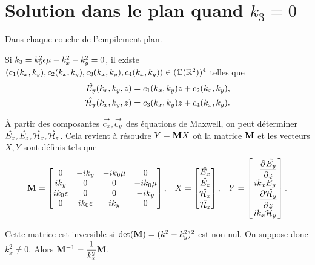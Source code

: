 \section[Solution dans le plan quand k3 = 0]{Solution dans le plan quand \(k_3 = 0\)}
  \label{sec:annexe:plan:k3_nul}

  Dans chaque couche de l'empilement plan.

  Si \(k_3 = k_0^2\eps\mu - k_x^2 - k_y^2 = 0\), il existe \((c_1(k_x,k_y),c_2(k_x,k_y),c_3(k_x,k_y),c_4(k_x,k_y)) \in (\CC(\RR^2))^4\) telles que
  \begin{align*}
    \hat{E_y}(k_x,k_y,z) &= c_1(k_x,k_y) z + c_2(k_x,k_y),
    \\   
    \hat{\cH_y}(k_x,k_y,z) &= c_3(k_x,k_y) z + c_4(k_x,k_y).
  \end{align*}

  À partir des composantes \(\vect{e_x},\vect{e_y}\) des équations de Maxwell, on peut déterminer \(\hat{E_x},\hat{E_z},\hat{\cH_x},\hat{\cH_z}\).
  Cela revient à résoudre \(Y = \mM X\) où la matrice \(\mM\) et les vecteurs \(X, Y\) sont définis tels que
  \begin{align*}
    \mM =
    \begin{bmatrix}
    0 & -ik_y & -ik_0\mu & 0
    \\
    ik_y & 0 & 0 & -ik_0\mu
    \\
    ik_0\eps & 0 & 0 & -ik_y
    \\
    0 & ik_0\eps & ik_y & 0
    \end{bmatrix},
    &&
    X =
    \begin{bmatrix}
      \hat{E_x}\\
      \hat{E_z}\\
      \hat{\cH_x}\\
      \hat{\cH_z}
    \end{bmatrix},
    &&
    Y =
    \begin{bmatrix}
      -\ddr{z}{\hat{E_y}}\\
      ik_x\hat{E_y}\\
      -\ddr{z}{\hat{\cH_y}}\\
      ik_x\hat{\cH_y}
    \end{bmatrix}.
  \end{align*}

  Cette matrice est inversible si \(\det(\mM) = (k^2 - k_y^2)^2 \) est non nul. On suppose donc \(k_x^2\not=0\). Alors \(\mM^{-1}=\frac{1}{k_x^2}\mM\).


